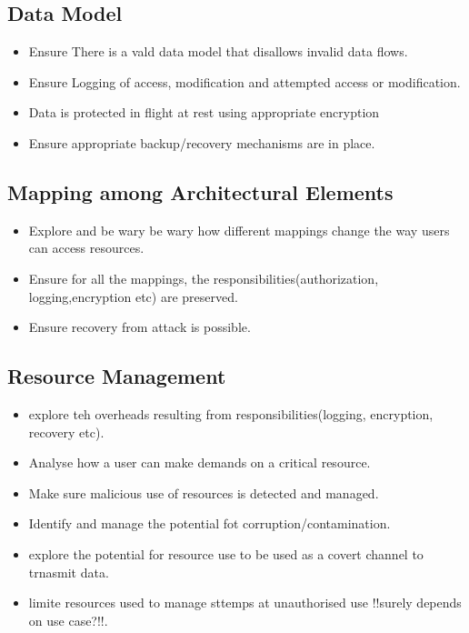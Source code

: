 \documentclass[a4paper]{report}
\begin{document}
\subsection{Data Model}
\begin{itemize}
\item Ensure There is a vald data model that disallows invalid data flows.
\item Ensure Logging of access, modification and attempted access or modification.
\item Data is protected in flight at rest using appropriate encryption
\item Ensure appropriate backup/recovery mechanisms are in place. 
\end{itemize}

\subsection{Mapping among Architectural Elements}
\begin{itemize}
\item Explore and be wary be wary how different mappings change the way users can access resources.
\item Ensure for all the mappings, the responsibilities(authorization, logging,encryption etc) are preserved.
\item Ensure recovery from attack is possible.
\end{itemize}
\subsection{Resource Management}
\begin{itemize}
\item explore teh overheads resulting from responsibilities(logging, encryption, recovery etc).
\item Analyse how a user can make demands on a critical resource.
\item Make sure malicious use of resources is detected and managed.
\item Identify and manage the potential fot corruption/contamination.
\item explore the potential for resource use to be used as a covert channel to trnasmit data.
\item limite resources used to manage sttemps at unauthorised use !!surely depends on use case?!!.
\end{itemize}
\end{document}
